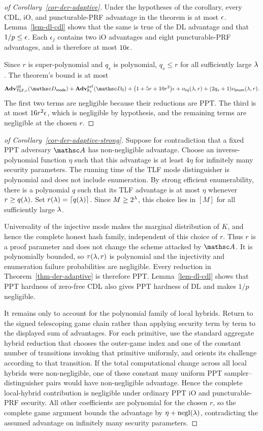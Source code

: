\begin{proof}[of Corollary~\ref{cor-der-adaptive}]
Under the hypotheses of the corollary, every CDL, iO, and puncturable-PRF advantage in the theorem is at most $\epsilon$. Lemma~\ref{lem-dl-cdl} shows that the same is true of the DL advantage and that $1/p\le\epsilon$. Each $\epsilon_j$ contains two iO advantages and eight puncturable-PRF advantages, and is therefore at most $10\epsilon$.

Since $r$ is super-polynomial and $q_s$ is polynomial, $q_s\le r$ for all sufficiently large $\lambda$. The theorem's bound is at most
$$
\AdvTLF{\TLF,r}{\advD_{\mathsf{mode}}}
+\AdvPRF{\PRF_0}{\advD_0}
+\bigl(1+5r+10r^2\bigr)\eps
+\nu_{\mathsf{inj}}(\secp,r)
+(2q_s+1)\nu_{\mathsf{enum}}(\secp,r).
$$
The first two terms are negligible because their reductions are PPT. The third is at most $16r^2\epsilon$, which is negligible by hypothesis, and the remaining terms are negligible at the chosen $r$.
\end{proof}

\begin{proof}[of Corollary~\ref{cor-der-adaptive-strong}]
Suppose for contradiction that a fixed PPT adversary $\advA$ has non-negligible advantage. Choose an inverse-polynomial function $\eta$ such that this advantage is at least $4\eta$ for infinitely many security parameters. The running time of the TLF mode distinguisher is polynomial and does not include enumeration. By strong efficient enumerability, there is a polynomial $q$ such that its TLF advantage is at most $\eta$ whenever $r\ge q(\lambda)$. Set $r(\lambda)=\lceil q(\lambda)\rceil$. Since $M\ge2^\lambda$, this choice lies in $[M]$ for all sufficiently large $\lambda$.

Universality of the injective mode makes the marginal distribution of $K$, and hence the complete honest hash family, independent of this choice of $r$. Thus $r$ is a proof parameter and does not change the scheme attacked by $\advA$. It is polynomially bounded, so $\tau(\lambda,r)$ is polynomial and the injectivity and enumeration failure probabilities are negligible. Every reduction in Theorem~\ref{thm-der-adaptive} is therefore PPT. Lemma~\ref{lem-dl-cdl} shows that PPT hardness of zero-free CDL also gives PPT hardness of DL and makes $1/p$ negligible.

It remains only to account for the polynomial family of local hybrids. Return to the signed telescoping game chain rather than applying security term by term to the displayed sum of advantages. For each primitive, use the standard aggregate hybrid reduction that chooses the outer-game index and one of the constant number of transitions invoking that primitive uniformly, and orients its challenge according to that transition. If the total computational change across all local hybrids were non-negligible, one of these constant many uniform PPT sampler--distinguisher pairs would have non-negligible advantage. Hence the complete local-hybrid contribution is negligible under ordinary PPT iO and puncturable-PRF security. All other coefficients are polynomial for the chosen $r$, so the complete game argument bounds the advantage by $\eta+\mathrm{negl}(\lambda)$, contradicting the assumed advantage on infinitely many security parameters.
\end{proof}
